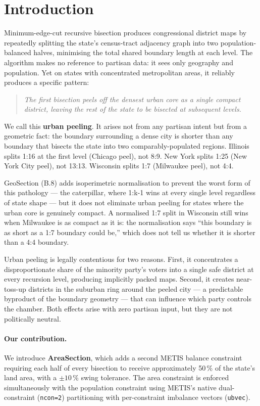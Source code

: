 \section{Introduction}
\label{sec:intro}

Minimum-edge-cut recursive bisection produces congressional district maps by
repeatedly splitting the state's census-tract adjacency graph into two
population-balanced halves, minimising the total shared boundary length at each
level. The algorithm makes no reference to partisan data: it sees only
geography and population. Yet on states with concentrated metropolitan areas,
it reliably produces a specific pattern:

\begin{quote}
\emph{The first bisection peels off the densest urban core as a single compact
district, leaving the rest of the state to be bisected at subsequent levels.}
\end{quote}

We call this \textbf{urban peeling}. It arises not from any partisan intent
but from a geometric fact: the boundary surrounding a dense city is shorter
than any boundary that bisects the state into two comparably-populated regions.
Illinois splits 1:16 at the first level (Chicago peel), not 8:9.
New York splits 1:25 (New York City peel), not 13:13.
Wisconsin splits 1:7 (Milwaukee peel), not 4:4.

GeoSection (B.8) adds isoperimetric normalisation to prevent the worst form
of this pathology --- the caterpillar, where 1:k-1 wins at every single
level regardless of state shape --- but it does not eliminate urban peeling
for states where the urban core is genuinely compact.
A normalised 1:7 split in Wisconsin still wins when Milwaukee is as compact
as it is: the normalisation says ``this boundary is as short as a 1:7 boundary
could be,'' which does not tell us whether it is shorter than a 4:4 boundary.

Urban peeling is legally contentious for two reasons.
First, it concentrates a disproportionate share of the minority party's voters
into a single safe district at every recursion level, producing implicitly
packed maps.
Second, it creates near-toss-up districts in the suburban ring around the
peeled city --- a predictable byproduct of the boundary geometry --- that
can influence which party controls the chamber.
Both effects arise with zero partisan input, but they are not politically
neutral.

\paragraph{Our contribution.}
We introduce \textbf{AreaSection}, which adds a second METIS balance constraint
requiring each half of every bisection to receive approximately 50\,\% of the
state's land area, with a $\pm 10$\,\% swing tolerance.
The area constraint is enforced simultaneously with the population constraint
using METIS's native dual-constraint (\texttt{ncon=2}) partitioning with
per-constraint imbalance vectors (\texttt{ubvec}).


